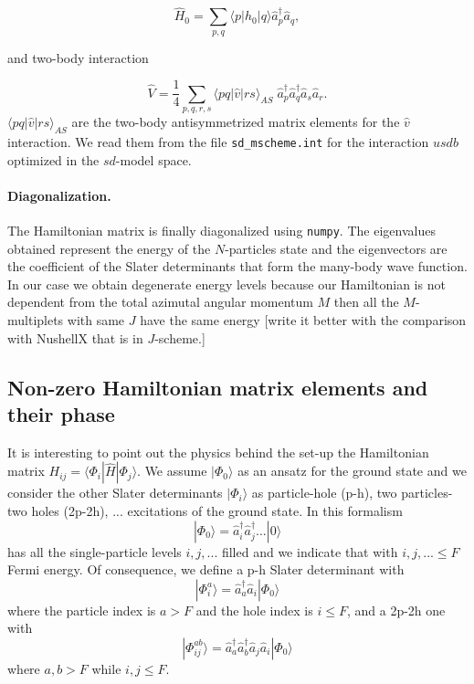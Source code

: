 \documentclass[twoside]{article}
\newcommand{\bra}[1]{\langle #1 |}
\newcommand{\ket}[1]{| #1 \rangle}
\begin{document}
\begin{equation}
\hat H_0 =  \sum_{p,q} \langle p \vert \hat h_0 \vert q \rangle \hat a_{p}^\dagger \hat a_{q},
\end{equation}

and two-body interaction

\begin{equation}
\hat V = \frac{1}{4} \sum_{p,q,r,s} \langle p q\vert \hat v \vert rs \rangle_{AS} \;\hat a_{p}^\dagger \hat a_{q}^\dagger \hat a_{s} \hat a_{r}.
\end{equation}
$\langle p q\vert \hat v \vert rs \rangle_{AS}$ are the two-body antisymmetrized matrix elements for the $\hat v$ interaction. We read them from the file \texttt{sd\_mscheme.int} for the interaction $usdb$ optimized in the $sd$-model space.

\paragraph{Diagonalization.} The Hamiltonian matrix is finally diagonalized using \texttt{numpy}. The eigenvalues obtained represent the energy of the $N$-particles state and the eigenvectors are the coefficient of the Slater determinants that form the many-body wave function. In our case we obtain degenerate energy levels because our Hamiltonian is not dependent from the total azimutal angular momentum $M$ then all the $M$-multiplets with same $J$ have the same energy [write it better with the comparison with NushellX that is in $J$-scheme.]



\subsection{Non-zero Hamiltonian matrix elements and their phase}

It is interesting to point out the physics behind the set-up the Hamiltonian matrix $H_{ij}=\bra{\Phi_i} \hat H \ket{\Phi_j}$.
We assume $\ket{\Phi_0}$ as an ansatz for the ground state and we consider the other Slater determinants $\ket{\Phi_i}$ as particle-hole (p-h), two particles- two holes (2p-2h), ... excitations of the ground state.
In this formalism 
\begin{equation}
\ket{\Phi_0} = \hat a_{i}^\dagger \hat a_{j}^\dagger... \ket{0}
\end{equation}
has all the single-particle levels $i,j,...$ filled and we indicate that with $i,j,...\leq F$ Fermi energy.
Of consequence, we define a p-h Slater determinant with 
\begin{equation}
\ket{\Phi_i^a} = \hat a_{a}^\dagger \hat a_{i} \ket{\Phi_0}
\end{equation}
where the particle index is $a > F$ and the hole index is $i \leq F$, and a 2p-2h one with 
\begin{equation}
\ket{\Phi_{ij}^{ab}} = \hat a_{a}^\dagger \hat a_{b}^\dagger \hat a_{j} \hat a_{i} \ket{\Phi_0}
\end{equation}
where $a,b > F$ while $i,j \leq F$.
\end{document}
